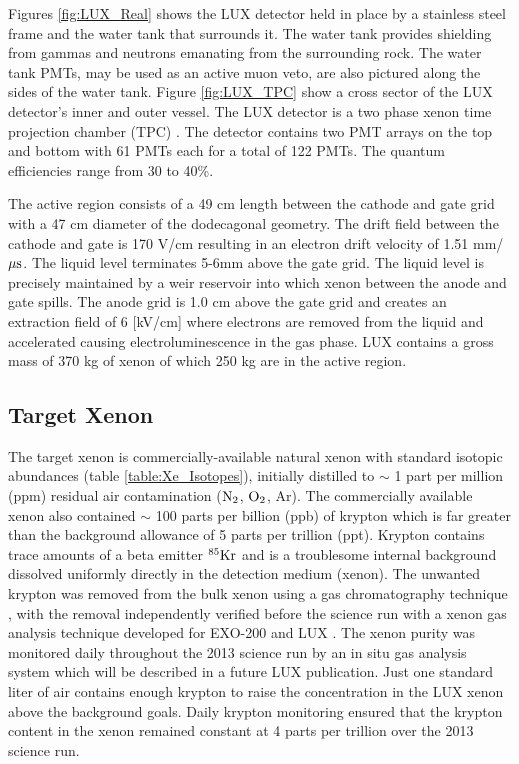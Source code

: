 Figures \ref{fig:LUX_Real} %
shows the LUX detector held in place by a stainless steel frame and the water tank that surrounds it. The water tank provides shielding from gammas and neutrons emanating from the surrounding rock. The water tank PMTs, may be used as an active muon veto, are also pictured along the sides of the water tank. Figure \ref{fig:LUX_TPC} show a cross sector of the LUX detector's inner and outer vessel. The LUX detector is a two phase xenon time projection chamber (TPC)  \cite{LUX_PRL}.  The detector contains two PMT arrays on the top and bottom with 61 PMTs each for a total of 122 PMTs. The quantum efficiencies range from 30 to 40\%. 

The active region consists of a 49 cm length between the cathode and gate grid with a 47 cm diameter of the dodecagonal geometry. The drift field between the cathode and gate is 170 V/cm resulting in an electron drift velocity of 1.51 mm/$\rm \mu s$. The liquid level terminates 5-6mm above the gate grid. The liquid level is precisely maintained by a weir reservoir into which xenon between the anode and gate spills. The anode grid is 1.0 cm above the gate grid and creates an extraction field of 6 [kV/cm] where electrons are removed from the liquid and accelerated causing electroluminescence in the gas phase.  LUX contains a gross mass of 370 kg of xenon of which 250 kg are in the active region.  

\subsection{Target Xenon}
The target xenon is commercially-available natural xenon with standard isotopic abundances (table \ref{table:Xe_Isotopes}), initially distilled to $\sim$ 1 part per million (ppm) residual air contamination ($\rm N_2$, $\rm O_2$, Ar). The commercially available xenon also contained $\sim$ 100 parts per billion (ppb) of krypton which is far greater than the background allowance of 5 parts per trillion (ppt). Krypton contains trace amounts of a beta emitter $\rm ^{85}Kr$ and is a troublesome internal background dissolved uniformly directly in the detection medium (xenon). The unwanted krypton was removed from the bulk xenon using a gas chromatography technique \cite{lux_kr_removal}, with the removal independently verified before the science run with a xenon gas analysis technique developed for EXO-200 and LUX \cite{Kr_ppt_Dobi}. The xenon purity was monitored daily throughout the 2013 science run by an in situ gas analysis system which will be described in a future LUX publication. Just one standard liter of air contains enough krypton to raise the concentration in the LUX xenon above the background goals. Daily krypton monitoring ensured that the krypton content in the xenon remained constant at 4 parts per trillion over the 2013 science run\cite{LUX_BG}.


